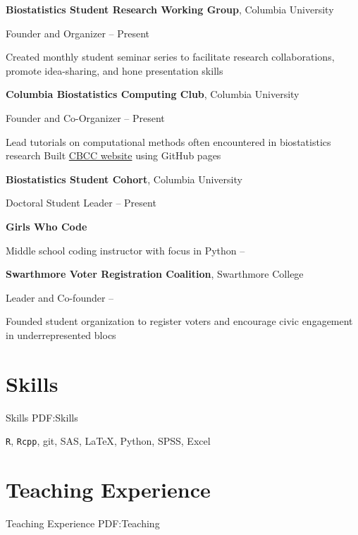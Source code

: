 \documentclass[a4paper,10pt,oneside]{article}
\begin{document}
\begin{body}
\textbf{Biostatistics Student Research Working Group},
Columbia University
\par
Founder and Organizer
\hfill
{} --
Present
\begin{detail}
\BulletItem
Created monthly student seminar series to facilitate research collaborations, promote idea-sharing, and hone presentation skills 
\end{detail}

\EntryGap
\textbf{Columbia Biostatistics Computing Club},
Columbia University
\par
Founder and Co-Organizer
\hfill
{} --
Present
\begin{detail}
\BulletItem
Lead tutorials on computational methods often encountered in biostatistics research
\BulletItem Built \href{https://columbia-computing-club.github.io/}{CBCC website} using GitHub pages 
\end{detail}

\EntryGap
\textbf{Biostatistics Student Cohort},
Columbia University
\par
Doctoral Student Leader
\hfill
{} --
Present

\EntryGap
\textbf{Girls Who Code}
\par
Middle school coding instructor with focus in Python
\hfill
{} --

\EntryGap
\textbf{Swarthmore Voter Registration Coalition},
Swarthmore College
\par
Leader and Co-founder
\hfill
{} --
\begin{detail}
\BulletItem
Founded student organization to register voters and encourage civic engagement in underrepresented blocs
\end{detail}


\section
{Skills}
{Skills}
{PDF:Skills}

\texttt{R}, \texttt{Rcpp}, git, SAS, {\LaTeX}, Python, SPSS, Excel 


\section
{Teaching \newline
Experience}
{Teaching Experience}
{PDF:Teaching}


\end{body}
\end{document}
